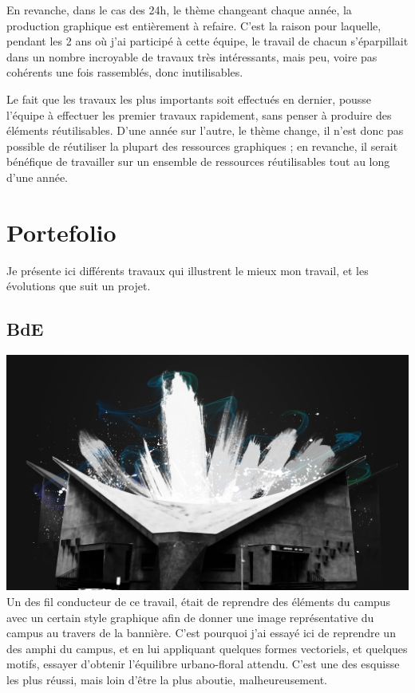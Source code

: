         En revanche, dans le cas des 24h,  le thème changeant chaque année, la production graphique est entièrement à refaire.
        C'est la raison pour laquelle, pendant les 2 ans où j'ai participé à cette équipe, le travail de chacun s'éparpillait dans un nombre incroyable de travaux très intéressants, mais peu, voire pas cohérents une fois rassemblés, donc inutilisables.
        
        Le fait que les travaux les plus importants soit effectués en dernier, pousse l'équipe à effectuer les premier travaux rapidement, sans penser à produire des éléments réutilisables.
        D'une année sur l'autre, le thème change, il n'est donc pas possible de réutiliser la plupart des ressources graphiques ; en revanche, il serait bénéfique de travailler sur un ensemble de ressources réutilisables tout au long d'une année.

\newpage

\section{Portefolio}

    Je présente ici différents travaux qui illustrent le mieux mon travail, et les évolutions que suit un projet.
    \subsection{BdE}
        \begin{center}
            \includegraphics[width=\textwidth]{img/amphi.jpg}\\
            Un des fil conducteur de ce travail, était de reprendre des éléments du campus avec un certain style graphique afin de donner une image représentative du campus au travers de la bannière.
	        C'est pourquoi j'ai essayé ici de reprendre un des amphi du campus, et en lui appliquant quelques formes vectoriels, et quelques motifs, essayer d'obtenir l'équilibre urbano-floral attendu.
            C'est une des esquisse les plus réussi, mais loin d'être la plus aboutie, malheureusement.
        \end{center}


